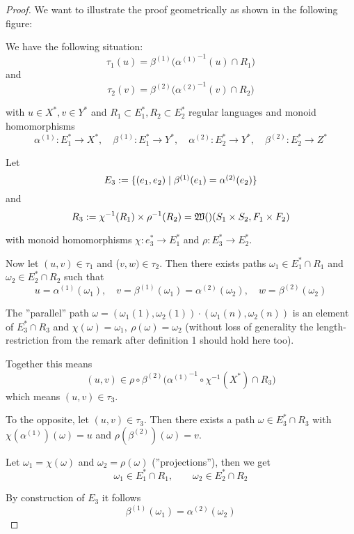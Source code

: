 \begin{proof}
We want to illustrate the proof geometrically as shown in the following figure:

\begin{center}
\end{center}

We have the following situation:
\[ \tau_1(u) = \beta^{(1)}\big( {\alpha^{(1)}}^{-1}(u) \cap R_1 \big) \]
and
\[ \tau_2(v) = \beta^{(2)}\big( {\alpha^{(2)}}^{-1}(v) \cap R_2 \big) \]

with $u \in X^*, v \in Y^*$ and $R_1 \subset E_1^*, R_2 \subset E_2^*$ regular
languages and monoid homomorphisms
\[ \alpha^{(1)} : E_1^* \to X^*,\quad \beta^{(1)} : E_1^* \to
Y^*,\quad \alpha^{(2)} : E_2^* \to Y^*,\quad \beta^{(2)} : E_2^* \to Z^* \]

Let
\[ E_3 := \mbox{$\{(e_1, e_2) \mid \beta^{(1)}(e_1) = \alpha^{(2)}(e_2)\}$} \]
and 
\[ R_3 := \chi^{-1}(R_1) \times \rho^{-1}(R_2) = \mbox{$\mathfrak{W}({})$}(S_1 \times S_2, F_1
\times F_2) \]

with monoid homomorphisms $\chi: e_3^* \to E_1^*$ and $\rho: E_3^* \to E_2^*$.

Now let $(u, v) \in \tau_1$ and ($v, w) \in \tau_2$. Then there exists paths
$\omega_1 \in E_1^* \cap R_1$ and $\omega_2 \in E_2^* \cap R_2$ such that 
\[ u = \alpha^{(1)}(\omega_1),\quad v = \beta^{(1)}(\omega_1) =
\alpha^{(2)}(\omega_2),\quad w = \beta^{(2)}(\omega_2) \]

The ''parallel'' path $\omega = (\omega_1(1), \omega_2(1)) \cdot
(\omega_1(n), \omega_2(n))$ is an element of $E_3^* \cap R_3$ and 
$\chi(\omega) = \omega_1,\ \rho(\omega) = \omega_2$ (without loss of
generality the length-restriction from the remark after definition 1 should
hold here too).

Together this means
\[ (u, v) \in \rho \circ \beta^{(2)} \big( {\alpha^{(1)}}^{-1} \circ
\chi^{-1}(X^*) \cap R_3 \big) \]
which means $(u, v) \in \tau_3$.

To the opposite, let $(u, v) \in \tau_3$. Then there exists a path $\omega \in
E_3^* \cap R_3$ with $\chi(\alpha^{(1)})(\omega) = u$ and $\rho(\beta^{(2)})(\omega)
= v$.

Let $\omega_1 = \chi(\omega)$ and $\omega_2 = \rho(\omega)$ (''projections''), then we get
\[ \omega_1 \in E_1^* \cap R_1,\qquad \omega_2 \in E_2^* \cap R_2 \]

By construction of $E_3$ it follows
\[ \beta^{(1)}(\omega_1) = \alpha^{(2)}(\omega_2) \]
\end{proof}

